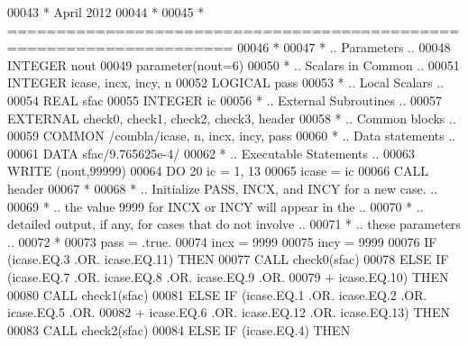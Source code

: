 \begin{DoxyCode}
00043 \textcolor{comment}{*     April 2012}
00044 \textcolor{comment}{*}
00045 \textcolor{comment}{*  =====================================================================}
00046 \textcolor{comment}{*}
00047 \textcolor{comment}{*     .. Parameters ..}
00048       \textcolor{keywordtype}{INTEGER}          nout
00049       parameter(nout=6)
00050 \textcolor{comment}{*     .. Scalars in Common ..}
00051       \textcolor{keywordtype}{INTEGER}          icase, incx, incy, n
00052       \textcolor{keywordtype}{LOGICAL}          pass
00053 \textcolor{comment}{*     .. Local Scalars ..}
00054       \textcolor{keywordtype}{REAL}             sfac
00055       \textcolor{keywordtype}{INTEGER}          ic
00056 \textcolor{comment}{*     .. External Subroutines ..}
00057       \textcolor{keywordtype}{EXTERNAL}         check0, check1, check2, check3, header
00058 \textcolor{comment}{*     .. Common blocks ..}
00059       \textcolor{keyword}{COMMON}           /combla/icase, n, incx, incy, pass
00060 \textcolor{comment}{*     .. Data statements ..}
00061       \textcolor{keyword}{DATA}             sfac/9.765625e-4/
00062 \textcolor{comment}{*     .. Executable Statements ..}
00063       \textcolor{keyword}{WRITE} (nout,99999)
00064       \textcolor{keywordflow}{DO} 20 ic = 1, 13
00065          icase = ic
00066          \textcolor{keyword}{CALL }header
00067 \textcolor{comment}{*}
00068 \textcolor{comment}{*        .. Initialize  PASS,  INCX,  and INCY for a new case. ..}
00069 \textcolor{comment}{*        .. the value 9999 for INCX or INCY will appear in the ..}
00070 \textcolor{comment}{*        .. detailed  output, if any, for cases  that do not involve ..}
00071 \textcolor{comment}{*        .. these parameters ..}
00072 \textcolor{comment}{*}
00073          pass = .true.
00074          incx = 9999
00075          incy = 9999
00076          \textcolor{keywordflow}{IF} (icase.EQ.3 .OR. icase.EQ.11) \textcolor{keywordflow}{THEN}
00077             \textcolor{keyword}{CALL }check0(sfac)
00078          \textcolor{keywordflow}{ELSE} \textcolor{keywordflow}{IF} (icase.EQ.7 .OR. icase.EQ.8 .OR. icase.EQ.9 .OR.
00079      +            icase.EQ.10) \textcolor{keywordflow}{THEN}
00080             \textcolor{keyword}{CALL }check1(sfac)
00081          \textcolor{keywordflow}{ELSE} \textcolor{keywordflow}{IF} (icase.EQ.1 .OR. icase.EQ.2 .OR. icase.EQ.5 .OR.
00082      +            icase.EQ.6 .OR. icase.EQ.12 .OR. icase.EQ.13) \textcolor{keywordflow}{THEN}
00083             \textcolor{keyword}{CALL }check2(sfac)
00084          \textcolor{keywordflow}{ELSE} \textcolor{keywordflow}{IF} (icase.EQ.4) \textcolor{keywordflow}{THEN}

\end{DoxyCode}
